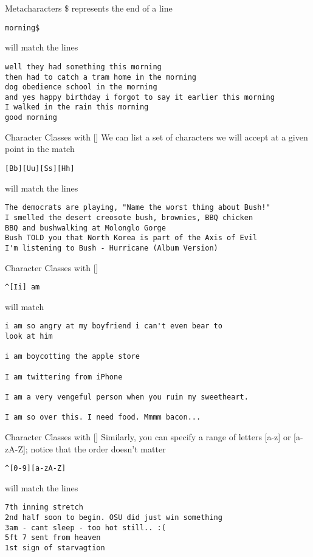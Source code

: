 \documentclass[aspectratio=169]{beamer}
\begin{document}
\begin{frame}[fragile]{Metacharacters}
\$ represents the end of a line
\begin{verbatim}
morning$ 
\end{verbatim}
will match the lines 
\begin{verbatim}
well they had something this morning
then had to catch a tram home in the morning
dog obedience school in the morning
and yes happy birthday i forgot to say it earlier this morning 
I walked in the rain this morning
good morning
\end{verbatim}
\end{frame}

\begin{frame}[fragile]{Character Classes with []}
We can list a set of characters we will accept at a given point in the
match
\begin{verbatim}
[Bb][Uu][Ss][Hh]
\end{verbatim}
will match the lines 
\begin{verbatim}
The democrats are playing, "Name the worst thing about Bush!"
I smelled the desert creosote bush, brownies, BBQ chicken
BBQ and bushwalking at Molonglo Gorge
Bush TOLD you that North Korea is part of the Axis of Evil 
I'm listening to Bush - Hurricane (Album Version)
\end{verbatim}
\end{frame}

\begin{frame}[fragile]{Character Classes with []}
\begin{verbatim}
^[Ii] am
\end{verbatim}
will match
\begin{verbatim}
i am so angry at my boyfriend i can't even bear to 
look at him

i am boycotting the apple store

I am twittering from iPhone

I am a very vengeful person when you ruin my sweetheart.

I am so over this. I need food. Mmmm bacon...
\end{verbatim}
\end{frame}

\begin{frame}[fragile]{Character Classes with []}
Similarly, you can specify a range of letters [a-z] or 
[a-zA-Z]; notice that the order doesn't matter
\begin{verbatim}
^[0-9][a-zA-Z]
\end{verbatim}
will match the lines 
\begin{verbatim}
7th inning stretch
2nd half soon to begin. OSU did just win something
3am - cant sleep - too hot still.. :(
5ft 7 sent from heaven 
1st sign of starvagtion
\end{verbatim}
\end{frame}
\end{document}

